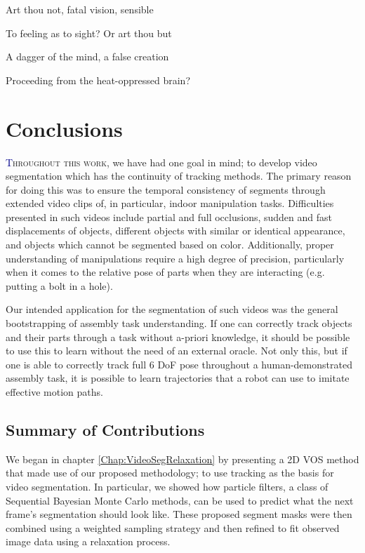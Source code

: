 \begin{savequote}[75mm]
Art thou not, fatal vision, sensible

To feeling as to sight? Or art thou but

A dagger of the mind, a false creation

Proceeding from the heat-oppressed brain?
\end{savequote}


\chapter{Conclusions}
\label{Chap:Conclusions}
\lettrine[lines=3, loversize=0.3]{\textcolor{DarkBlue}T}{hroughout this work,}  we have had one goal in mind; to develop video segmentation which has the continuity of tracking methods. The primary reason for doing this was to ensure the temporal consistency of segments through extended video clips of, in particular, indoor manipulation tasks. Difficulties presented in such videos include partial and full occlusions, sudden and fast displacements of objects, different objects with similar or identical appearance, and objects which cannot be segmented based on color. Additionally, proper understanding of manipulations require a high degree of precision, particularly when it comes to the relative pose of parts when they are interacting (e.g. putting a bolt in a hole).

Our intended application for the segmentation of such videos was the general bootstrapping of assembly task understanding. If one can correctly track objects and their parts through a task without a-priori knowledge, it should be possible to use this to learn without the need of an external oracle. Not only this, but if one is able to correctly track full 6 DoF pose throughout a human-demonstrated assembly task, it is possible to learn trajectories that a robot can use to imitate effective motion paths.

\section{Summary of Contributions}
We began in chapter \ref{Chap:VideoSegRelaxation} by presenting a 2D VOS method that made use of our proposed methodology; to use tracking as the basis for video segmentation. In particular, we showed how particle filters, a class of Sequential Bayesian Monte Carlo methods, can be used to predict what the next frame's segmentation should look like. These proposed segment masks were then combined using a weighted sampling strategy and then refined to fit observed image data using a relaxation process.

